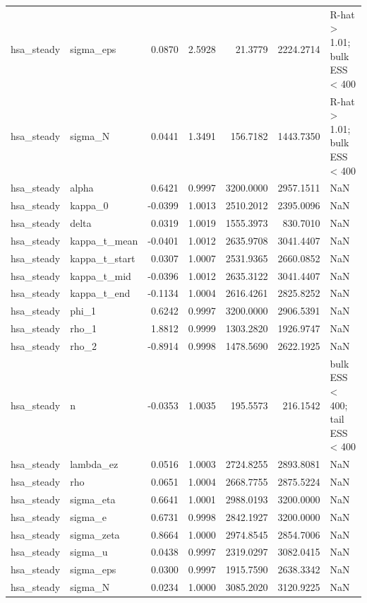 \begin{tabular}{llrrrrl}
hsa\_steady & sigma\_eps & 0.0870 & 2.5928 & 21.3779 & 2224.2714 & R-hat > 1.01; bulk ESS < 400 \\
hsa\_steady & sigma\_N & 0.0441 & 1.3491 & 156.7182 & 1443.7350 & R-hat > 1.01; bulk ESS < 400 \\
hsa\_steady & alpha & 0.6421 & 0.9997 & 3200.0000 & 2957.1511 & NaN \\
hsa\_steady & kappa\_0 & -0.0399 & 1.0013 & 2510.2012 & 2395.0096 & NaN \\
hsa\_steady & delta & 0.0319 & 1.0019 & 1555.3973 & 830.7010 & NaN \\
hsa\_steady & kappa\_t\_mean & -0.0401 & 1.0012 & 2635.9708 & 3041.4407 & NaN \\
hsa\_steady & kappa\_t\_start & 0.0307 & 1.0007 & 2531.9365 & 2660.0852 & NaN \\
hsa\_steady & kappa\_t\_mid & -0.0396 & 1.0012 & 2635.3122 & 3041.4407 & NaN \\
hsa\_steady & kappa\_t\_end & -0.1134 & 1.0004 & 2616.4261 & 2825.8252 & NaN \\
hsa\_steady & phi\_1 & 0.6242 & 0.9997 & 3200.0000 & 2906.5391 & NaN \\
hsa\_steady & rho\_1 & 1.8812 & 0.9999 & 1303.2820 & 1926.9747 & NaN \\
hsa\_steady & rho\_2 & -0.8914 & 0.9998 & 1478.5690 & 2622.1925 & NaN \\
hsa\_steady & n & -0.0353 & 1.0035 & 195.5573 & 216.1542 & bulk ESS < 400; tail ESS < 400 \\
hsa\_steady & lambda\_ez & 0.0516 & 1.0003 & 2724.8255 & 2893.8081 & NaN \\
hsa\_steady & rho & 0.0651 & 1.0004 & 2668.7755 & 2875.5224 & NaN \\
hsa\_steady & sigma\_eta & 0.6641 & 1.0001 & 2988.0193 & 3200.0000 & NaN \\
hsa\_steady & sigma\_e & 0.6731 & 0.9998 & 2842.1927 & 3200.0000 & NaN \\
hsa\_steady & sigma\_zeta & 0.8664 & 1.0000 & 2974.8545 & 2854.7006 & NaN \\
hsa\_steady & sigma\_u & 0.0438 & 0.9997 & 2319.0297 & 3082.0415 & NaN \\
hsa\_steady & sigma\_eps & 0.0300 & 0.9997 & 1915.7590 & 2638.3342 & NaN \\
hsa\_steady & sigma\_N & 0.0234 & 1.0000 & 3085.2020 & 3120.9225 & NaN \\
\bottomrule
\end{tabular}
